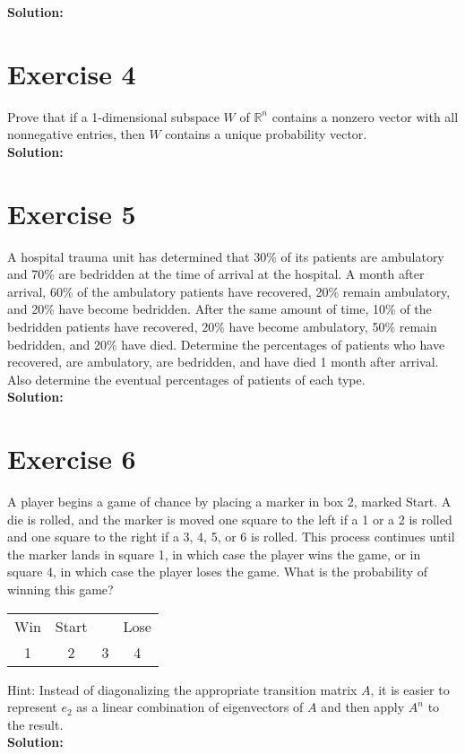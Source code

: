 \documentclass{article}
\begin{document}
\textbf{Solution:} \\



\newpage

\section*{Exercise 4}
Prove that if a 1-dimensional subspace $W$ of $\mathbb{R}^n$ contains a nonzero vector with all nonnegative entries, then $W$ contains a unique probability vector. \\

\textbf{Solution:} \\



\newpage

\section*{Exercise 5}
A hospital trauma unit has determined that 30\% of its patients are ambulatory and 70\% are bedridden at the time of arrival at the hospital. A month after arrival, 60\% of the ambulatory patients have recovered, 20\% remain ambulatory, and 20\% have become bedridden. After the same amount of time, 10\% of the bedridden patients have recovered, 20\% have become ambulatory, 50\% remain bedridden, and 20\% have died. Determine the percentages of patients who have recovered, are ambulatory, are bedridden, and have died 1 month after arrival. Also determine the eventual percentages of patients of each type. \\

\textbf{Solution:} \\



\newpage

\section*{Exercise 6}
A player begins a game of chance by placing a marker in box 2, marked Start. A die is rolled, and the marker is moved one square to the left if a 1 or a 2 is rolled and one square to the right if a 3, 4, 5, or 6 is rolled. This process continues until the marker lands in square 1, in which case the player wins the game, or in square 4, in which case the player loses the game. What is the probability of winning this game?

\begin{center}
\begin{tabular}{|c|c|c|c|}
\hline
Win & Start & & Lose \\
1 & 2 & 3 & 4 \\
\hline
\end{tabular}
\end{center}

Hint: Instead of diagonalizing the appropriate transition matrix $A$, it is easier to represent $e_2$ as a linear combination of eigenvectors of $A$ and then apply $A^n$ to the result. \\

\textbf{Solution:} \\
\end{document}
